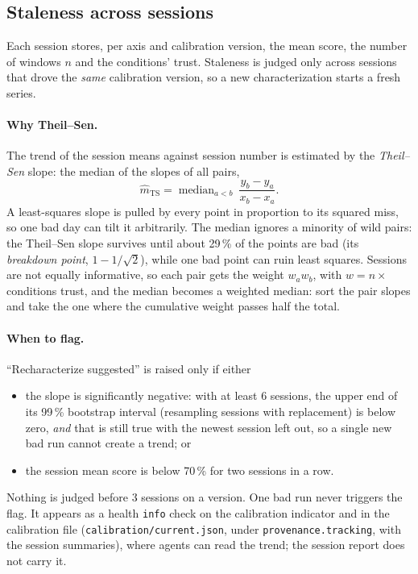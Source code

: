 \subsection{Staleness across sessions}

Each session stores, per axis and calibration version, the mean score, the number of
windows $n$ and the conditions' trust. Staleness is judged only across sessions that
drove the \emph{same} calibration version, so a new characterization starts a fresh
series.

\paragraph{Why Theil--Sen.} The trend of the session means against session number is
estimated by the \emph{Theil--Sen} slope: the median of the slopes of all pairs,
\[
  \hat m_{\mathrm{TS}} = \operatorname{median}_{a < b}\ \frac{y_b - y_a}{x_b - x_a}.
\]
A least-squares slope is pulled by every point in proportion to its squared miss, so
one bad day can tilt it arbitrarily. The median ignores a minority of wild pairs:
the Theil--Sen slope survives until about 29\,\% of the points are bad (its
\emph{breakdown point}, $1 - 1/\sqrt2$), while one bad point can ruin least squares.
Sessions are not equally informative, so each pair gets the weight $w_aw_b$, with
$w = n \times$ conditions trust, and the median becomes a weighted median: sort the
pair slopes and take the one where the cumulative weight passes half the total.

\paragraph{When to flag.} ``Recharacterize suggested'' is raised only if either
\begin{itemize}[nosep]
  \item the slope is significantly negative: with at least 6 sessions, the upper end
        of its 99\,\% bootstrap interval (resampling sessions with replacement) is
        below zero, \emph{and} that is still true with the newest session left out,
        so a single new bad run cannot create a trend; or
  \item the session mean score is below 70\,\% for two sessions in a row.
\end{itemize}
Nothing is judged before 3 sessions on a version. One bad run never triggers the
flag. It appears as a health \texttt{info} check on the calibration indicator and in
the calibration file (\texttt{calibration/current.json}, under
\texttt{provenance.tracking}, with the session summaries), where agents can read the
trend; the session report does not carry it.

